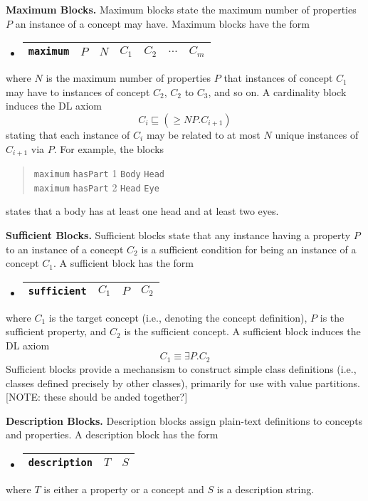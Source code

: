\documentclass[preprint,number]{elsarticle}
\newcommand{\myblock}[1]{\vspace{12pt}\noindent\textbf{#1}}
\begin{document}
\myblock{Maximum Blocks.} Maximum blocks state the maximum
number of properties $P$ an instance of a concept may have.
Maximum blocks have the form
\begin{itemize}
\item[]
  \begin{tabular}{|l|l|l|l|l|l|l|}\hline \texttt{maximum} & $P$ & $N$ & 
    $C_1$ & $C_2$ & $\dots$ & $C_m$
    \\ \hline
  \end{tabular}
\end{itemize}
where $N$ is the maximum number of properties $P$ that instances of
concept $C_1$ may have to instances of concept $C_2$, $C_2$ to $C_3$,
and so on. A cardinality block induces the DL axiom \[C_i \sqsubseteq
(\ge N P.C_{i+1})\] stating that each instance of $C_i$ may be related to
at most $N$ unique instances of $C_{i+1}$ via $P$. For example, the blocks
\begin{quote}
\texttt{maximum} \texttt{hasPart} 1 \texttt{Body} \texttt{Head} \\
\texttt{maximum} \texttt{hasPart} 2 \texttt{Head} \texttt{Eye}
\end{quote}
states that a body has at least one head and at least two eyes.


\myblock{Sufficient Blocks.} Sufficient blocks state that any instance
having a property $P$ to an instance of a concept $C_2$ is a
sufficient condition for being an instance of a concept $C_1$. A
sufficient block has the form
\begin{itemize}
\item[]
  \begin{tabular}{|l|l|l|l|}\hline \texttt{sufficient} & $C_1$ & $P$ & $C_2$
    \\ \hline
  \end{tabular}
\end{itemize}
where $C_1$ is the target concept (i.e., denoting the concept
definition), $P$ is the sufficient property, and $C_2$ is the
sufficient concept. A sufficient block induces the DL axiom \[C_1
\equiv \exists P.C_2\] Sufficient blocks provide a mechansism to
construct simple class definitions (i.e., classes defined precisely by
other classes), primarily for use with value partitions. [NOTE: these
should be anded together?]


\myblock{Description Blocks.} Description blocks assign plain-text
definitions to concepts and properties. A description block has the
form
\begin{itemize}
\item[]
  \begin{tabular}{|l|l|l|}\hline \texttt{description} & $T$ & $S$
    \\ \hline
  \end{tabular}
\end{itemize}
where $T$ is either a property or a concept and $S$ is a description
string.
\end{document}
